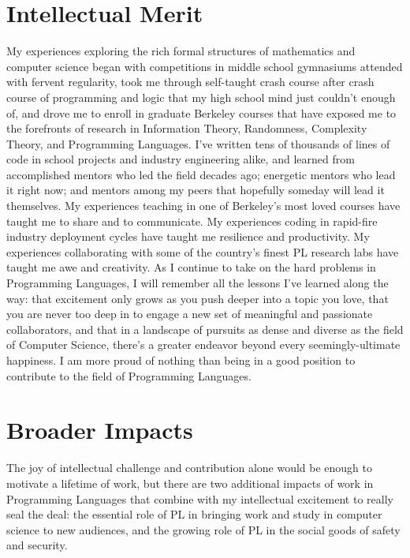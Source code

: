 \documentclass{nsf-grfp}
\begin{document}
\section*{Intellectual Merit}

My experiences exploring the rich formal structures of mathematics and computer science began with competitions in middle school gymnasiums attended with fervent regularity, took me through self-taught crash course after crash course of programming and logic that my high school mind just couldn't enough of, and drove me to enroll in graduate Berkeley courses that have exposed me to the forefronts of research in Information Theory, Randomness, Complexity Theory, and Programming Languages. I've written tens of thousands of lines of code in school projects and industry engineering alike, and learned from accomplished mentors who led the field decades ago; energetic mentors who lead it right now; and mentors among my peers that hopefully someday will lead it themselves. My experiences teaching in one of Berkeley's most loved courses have taught me to share and to communicate. My experiences coding in rapid-fire industry deployment cycles have taught me resilience and productivity. My experiences collaborating with some of the country's finest PL research labs have taught me awe and creativity. As I continue to take on the hard problems in Programming Languages, I will remember all the lessons I've learned along the way: that excitement only grows as you push deeper into a topic you love, that you are never too deep in to engage a new set of meaningful and passionate collaborators, and that in a landscape of pursuits as dense and diverse as the field of Computer Science, there's a greater endeavor beyond every seemingly-ultimate happiness. I am more proud of nothing than being in a good position to contribute to the field of Programming Languages.

\section*{Broader Impacts}

The joy of intellectual challenge and contribution alone would be enough to motivate a lifetime of work, but there are two additional impacts of work in Programming Languages that combine with my intellectual excitement to really seal the deal: the essential role of PL in bringing work and study in computer science to new audiences, and the growing role of PL in the social goods of safety and security.
\end{document}
